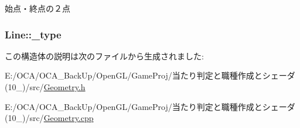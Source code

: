 始点・終点の２点 

\hypertarget{struct_line_ac6d9b4fc1370daa00c4bcd22d6e33a05}{
\subsubsection[{\-\_\-type}]{ Line\-::\-\_\-type}}\label{struct_line_ac6d9b4fc1370daa00c4bcd22d6e33a05}


この構造体の説明は次のファイルから生成されました\-:\begin{DoxyCompactItemize}
\item 
E\-:/\-O\-C\-A/\-O\-C\-A\-\_\-\-Back\-Up/\-Open\-G\-L/\-Game\-Proj/当たり判定と職種作成とシェーダ(10\-\_)/src/\hyperlink{_geometry_8h}{Geometry.\-h}\item 
E\-:/\-O\-C\-A/\-O\-C\-A\-\_\-\-Back\-Up/\-Open\-G\-L/\-Game\-Proj/当たり判定と職種作成とシェーダ(10\-\_)/src/\hyperlink{_geometry_8cpp}{Geometry.\-cpp}\end{DoxyCompactItemize}
